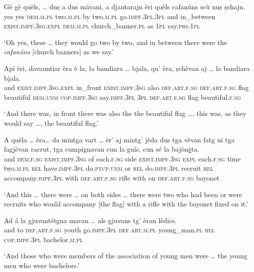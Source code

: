 \begin{linenumbers}
	\gll    Gè gè quèls, … duṣ a dus mávani, a djantarajn èri quèls cafanúns scù nuṣ ṣchajn. \\
	yes yes \textsc{dem.m.pl} {} two.\textsc{m.pl} by two.\textsc{m.pl}  go.\textsc{impf.3pl.3pl} and in\_between \textsc{exist.impf.3sg.expl}  \textsc{dem.m.pl} church\_banner.\textsc{pl} as \textsc{1pl} say.\textsc{prs.1pl} \\
\end{linenumbers}
\medskip
\glt `Oh yes, these … they would go two by two, and in between there were the \textit{cafanúns} [church banners] as we say.'
\medskip

\begin{linenumbers}
	\gll Api èri, davauntiar èra è la, la bandiara … bjala, qu’ èra, ṣchèvan aj … la bandiara bjala. \\
	and \textsc{exist.impf.3sg.expl} in\_front \textsc{exist.impf.3sg} also \textsc{def.art.f.sg} \textsc{def.art.f.sg} flag {} beautiful \textsc{dem.unm} \textsc{cop.impf.3sg} say.\textsc{impf.3pl}  \textsc{3pl} {} \textsc{def.art.f.sg} flag beautiful.\textsc{f.sg}\\
\end{linenumbers}
\medskip
\glt `And there was, in front there was also the the beautiful flag …, this was, as they would say …, the beautiful flag.'
\medskip

\begin{linenumbers}
	\gll    A quèla … èra… da mintga vart … èr’ aj mintg’ jèda dus tga vèvan fatg ni tga fagjèvan racrut, tga cumpignavan cun la guís, cun sé la bajòn\underline{è}ta.\\
	and \textsc{dem.f.sg} {} \textsc{exist.impf.3sg} {} of each.\textsc{f.sg} side {} \textsc{exist.impf.3sg} \textsc{expl} each.\textsc{f.sg} time two.\textsc{m.pl} \textsc{rel} have.\textsc{impf.3pl} do.\textsc{ptcp.unm} or \textsc{rel} do.\textsc{impf.3pl} recruit \textsc{rel} accompany.\textsc{impf.3pl} with  \textsc{def.art.f.sg} rifle with on  \textsc{def.art.f.sg} bayonet\\
\end{linenumbers}
\medskip
\glt `And this … there were … on both sides … there were two who had been or were recruits who would accompany [the flag] with a rifle with the bayonet fixed on it.'
\medskip

\begin{linenumbers}
	\gll    Ad á la gjuvantétgna mavan … als gjuvans tg’ èran lèdics.\\
	and to \textsc{def.art.f.sg} youth go.\textsc{impf.3pl} {} \textsc{def.art.m.pl} young\_man.\textsc{pl} \textsc{rel} \textsc{cop.impf.3pl} bachelor.\textsc{m.pl}\\
\end{linenumbers}
\medskip
\glt `And those who were members of the association of young men were … the young men who were bachelors.'
\medskip

